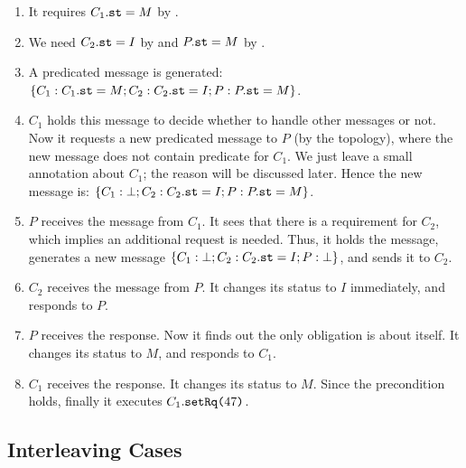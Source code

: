 \documentclass[format=manuscript]{acmart}
\begin{document}
\begin{enumerate}
\item It requires $C_1.\texttt{st} = M$ by .
\item We need $C_2.\texttt{st} = I$ by  and $P.\texttt{st} = M$ by
  .
\item A predicated message is generated: $\{ C_1: C_1.\texttt{st} = M; C_2:
  C_2.\texttt{st} = I; P: P.\texttt{st} = M \}$.
\item $C_1$ holds this message to decide whether to handle other messages or
  not. Now it requests a new predicated message to $P$ (by the topology), where
  the new message does not contain predicate for $C_1$. We just leave a small
  annotation about $C_1$; the reason will be discussed later. Hence the new
  message is: $\{ C_1: \bot; C_2: C_2.\texttt{st} = I; P: P.\texttt{st} = M \}$.
\item $P$ receives the message from $C_1$. It sees that there is a requirement
  for $C_2$, which implies an additional request is needed. Thus, it holds the
  message, generates a new message $\{ C_1: \bot; C_2: C_2.\texttt{st} = I; P: \bot
  \}$, and sends it to $C_2$.
\item $C_2$ receives the message from $P$. It changes its status to $I$
  immediately, and responds to $P$.
\item $P$ receives the response. Now it finds out the only obligation is about
  itself. It changes its status to $M$, and responds to $C_1$.
\item $C_1$ receives the response. It changes its status to $M$. Since the
  precondition holds, finally it executes $C_1.\texttt{setRq(}47\texttt{)}$.
\end{enumerate}

\subsection{Interleaving Cases}
\end{document}
